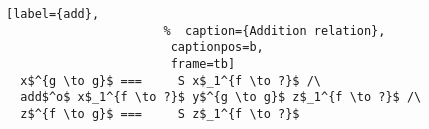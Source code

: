 \begin{figure}[!t]
  \centering
  \begin{minipage}{\columnwidth}
    \begin{lstlisting}[label={add},
                      %  caption={Addition relation},
                       captionpos=b,
                       frame=tb]
  x$^{g \to g}$ ===     S x$_1^{f \to ?}$ /\
  add$^o$ x$_1^{f \to ?}$ y$^{g \to g}$ z$_1^{f \to ?}$ /\
  z$^{f \to g}$ ===     S z$_1^{f \to ?}$
    \end{lstlisting}
  \end{minipage}
\end{figure}